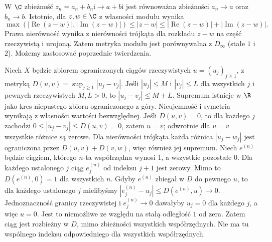 \begin{przyklad}
W $\C$ zbieżność $z_n=a_n+b_n\mathrm i\to a+b\mathrm i$ jest równoważna zbieżności $a_n\to a$ oraz $b_n\to b$. Istotnie, dla $z,w\in\C$ z własności modułu wynika
\[
 \max(|\operatorname{Re}(z-w)|,|\operatorname{Im}(z-w)|)
 \le |z-w|
 \le |\operatorname{Re}(z-w)|+|\operatorname{Im}(z-w)|.
\]
Prawa nierówność wynika z nierówności trójkąta dla rozkładu $z-w$ na część rzeczywistą i urojoną. Zatem metryka modułu jest porównywalna z $D_\infty$ (stałe $1$ i $2$). Możemy zastosować poprzednie twierdzenia.
\end{przyklad}
\begin{przyklad}
Niech $X$ będzie zbiorem ograniczonych ciągów rzeczywistych $u=(u_j)_{j\ge1}$, z metryką $D(u,v)=\sup_{j\ge1}|u_j-v_j|$. Jeśli $|u_j|\le M$ i $|v_j|\le L$ dla wszystkich $j$ i pewnych rzeczywistych $M,L>0$, to $|u_j-v_j|\le M+L$. Supremum istnieje w $\R$ jako kres niepustego zbioru ograniczonego z góry. Nieujemność i symetria wynikają z własności wartości bezwzględnej. Jeśli $D(u,v)=0$, to dla każdego $j$ zachodzi $0\le |u_j-v_j|\le D(u,v)=0$, zatem $u=v$; odwrotnie dla $u=v$ wszystkie różnice są zerowe. Dla nierówności trójkąta każda różnica $|u_j-w_j|$ jest ograniczona przez $D(u,v)+D(v,w)$, więc również jej supremum.
Niech $e^{(n)}$ będzie ciągiem, którego $n$-ta współrzędna wynosi $1$, a wszystkie pozostałe $0$. Dla każdego ustalonego $j$ ciąg $e_j^{(n)}$ od indeksu $j+1$ jest zerowy. Mimo to $D(e^{(n)},0)=1$ dla wszystkich $n$. Gdyby $e^{(n)}$ zbiegał w $D$ do pewnego $u$, to dla każdego ustalonego $j$ mielibyśmy $|e_j^{(n)}-u_j|\le D(e^{(n)},u)\to0$. Jednoznaczność granicy rzeczywistej i $e_j^{(n)}\to0$ dawałyby $u_j=0$ dla każdego $j$, a więc $u=0$. Jest to niemożliwe ze względu na stałą odległość $1$ od zera. Zatem ciąg jest rozbieżny w $D$, mimo zbieżności wszystkich współrzędnych. Nie ma tu wspólnego indeksu odpowiedniego dla wszystkich współrzędnych.
\end{przyklad}

